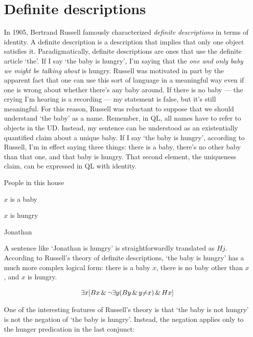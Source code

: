\section{Definite descriptions}
\label{sec.defdesc}
In 1905, Bertrand Russell famously characterized \emph{definite descriptions} in terms of identity. A definite description is a description that implies that only one object satisfies it. Paradigmatically, definite descriptions are ones that use the definite article `the'. If I say `the baby is hungry', I'm saying that the \emph{one and only baby we might be talking about} is hungry. Russell was motivated in part by the apparent fact that one can use this sort of language in a meaningful way even if one is wrong about whether there's any baby around. If there is no baby --- the crying I'm hearing is a recording --- my statement is false, but it's still meaningful. For this reason, Russell was reluctant to suppose that we should understand `the baby' as a name. Remember, in QL, all names have to refer to objects in the UD. Instead, my sentence can be understood as an existentially quantified claim about a unique baby. If I say `the baby is hungry', according to Russell, I'm in effect saying three things: there is a baby, there's no other baby than that one, and that baby is hungry. That second element, the uniqueness claim, can be expressed in QL with identity. 

\begin{ekey}
\item[UD:]People in this house
\item[Bx:]$x$ is a baby
\item[Hx:]$x$ is hungry
\item[j:]Jonathan
\end{ekey}

A sentence like `Jonathan is hungry' is straightforwardly translated as $Hj$. According to Russell's theory of definite descriptions, `the baby is hungry' has a much more complex logical form: there is a baby $x$, there is no baby other than $x$, and $x$ is hungry.

\begin{equation*}
\exists x [Bx \,\&\, \neg \exists y (By \,\&\, y {\neq} x) \,\&\, Hx]
\end{equation*}

One of the interesting features of Russell's theory is that `the baby is not hungry' is not the negation of `the baby is hungry'. Instead, the negation applies only to the hunger predication in the last conjunct:


